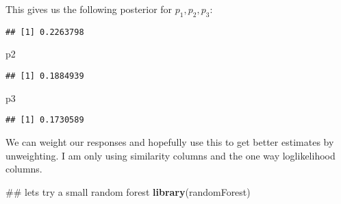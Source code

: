 \documentclass[10pt]{report}
\newenvironment{Shaded}{}{}
\newcommand{\KeywordTok}[1]{\textcolor[rgb]{0.00,0.44,0.13}{\textbf{{#1}}}}
\newcommand{\StringTok}[1]{\textcolor[rgb]{0.25,0.44,0.63}{{#1}}}
\newcommand{\NormalTok}[1]{{#1}}
\begin{document}
This gives us the following posterior for \(p_1, p_2, p_3\):

\begin{Shaded}
\end{Shaded}

\begin{verbatim}
## [1] 0.2263798
\end{verbatim}

\begin{Shaded}
\begin{Highlighting}[]
\NormalTok{p2}
\end{Highlighting}
\end{Shaded}

\begin{verbatim}
## [1] 0.1884939
\end{verbatim}

\begin{Shaded}
\begin{Highlighting}[]
\NormalTok{p3}
\end{Highlighting}
\end{Shaded}

\begin{verbatim}
## [1] 0.1730589
\end{verbatim}

We can weight our responses and hopefully use this to get better
estimates by unweighting. I am only using similarity columns and the one
way loglikelihood columns.

\begin{Shaded}
\begin{Highlighting}[]
\NormalTok{## lets try a small random forest}
\KeywordTok{library}\NormalTok{(randomForest)}
\end{Highlighting}
\end{Shaded}
\end{document}
